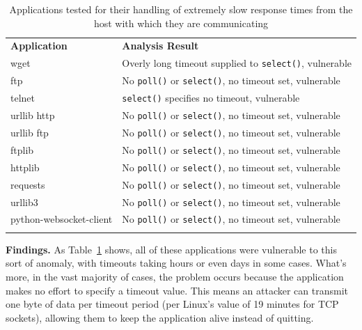 \begin{table}[t]
  \scriptsize{}
  \begin{tabular}{l | l}
    \toprule{}
	  {\bf Application}              & {\bf Analysis Result}\\
    wget                     & Overly long timeout supplied to {\tt select()}, vulnerable\\
    ftp                      & No {\tt poll()} or {\tt select()}, no timeout set, vulnerable\\
    telnet                   & {\tt select()} specifies no timeout, vulnerable\\
    urllib http              & No {\tt poll()} or {\tt select()}, no timeout set, vulnerable\\
    urllib ftp               & No {\tt poll()} or {\tt select()}, no timeout set, vulnerable\\
    ftplib                   & No {\tt poll()} or {\tt select()}, no timeout set, vulnerable\\
    httplib                  & No {\tt poll()} or {\tt select()}, no timeout set, vulnerable\\
    requests                 & No {\tt poll()} or {\tt select()}, no timeout set, vulnerable\\
    urllib3                  & No {\tt poll()} or {\tt select()}, no timeout set, vulnerable\\
    python-websocket-client  & No {\tt poll()} or {\tt select()}, no timeout set, vulnerable\\
    \bottomrule{}
  \end{tabular}
  \caption{Applications tested for their handling of extremely slow response
    times from the host with which they are communicating }
  \label{table:slowloris}
\end{table}


{\bf Findings.}
 As Table~\ref{table:slowloris} shows, all of these
 applications %
 were vulnerable to this sort of anomaly, with timeouts taking hours or
even days in some cases.
What's more, in the vast
majority of cases, the problem occurs because the application makes no effort to specify a
timeout value.
This means an attacker can transmit one byte of data per timeout
period (per Linux's value of 19 minutes for TCP sockets),
allowing them to keep the application alive instead of quitting.


